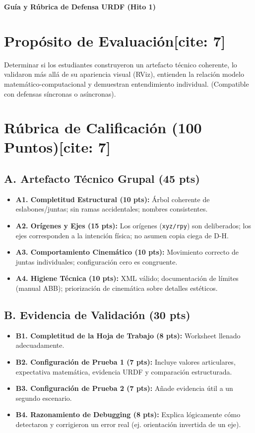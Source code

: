 \documentclass[11pt, a4paper]{article}
\begin{document}
\begin{center}
    \Large\textbf{\textcolor{ucbblue}{Guía y Rúbrica de Defensa URDF (Hito 1)}}\\[0.2cm]
\end{center}

\section*{Propósito de Evaluación[cite: 7]}
Determinar si los estudiantes construyeron un artefacto técnico coherente, lo validaron más allá de su apariencia visual (RViz), entienden la relación modelo matemático-computacional y demuestran entendimiento individual. (Compatible con defensas síncronas o asíncronas).

\section*{Rúbrica de Calificación (100 Puntos)[cite: 7]}

\subsection*{A. Artefacto Técnico Grupal (45 pts)}
\begin{itemize}
    \item \textbf{A1. Completitud Estructural (10 pts):} Árbol coherente de eslabones/juntas; sin ramas accidentales; nombres consistentes.
    \item \textbf{A2. Orígenes y Ejes (15 pts):} Los orígenes (\texttt{xyz/rpy}) son deliberados; los ejes corresponden a la intención física; no asumen copia ciega de D-H.
    \item \textbf{A3. Comportamiento Cinemático (10 pts):} Movimiento correcto de juntas individuales; configuración cero es congruente.
    \item \textbf{A4. Higiene Técnica (10 pts):} XML válido; documentación de límites (manual ABB); priorización de cinemática sobre detalles estéticos.
\end{itemize}

\subsection*{B. Evidencia de Validación (30 pts)}
\begin{itemize}
    \item \textbf{B1. Completitud de la Hoja de Trabajo (8 pts):} Worksheet llenado adecuadamente.
    \item \textbf{B2. Configuración de Prueba 1 (7 pts):} Incluye valores articulares, expectativa matemática, evidencia URDF y comparación estructurada.
    \item \textbf{B3. Configuración de Prueba 2 (7 pts):} Añade evidencia útil a un segundo escenario.
    \item \textbf{B4. Razonamiento de Debugging (8 pts):} Explica lógicamente cómo detectaron y corrigieron un error real (ej. orientación invertida de un eje).
\end{itemize}
\end{document}
